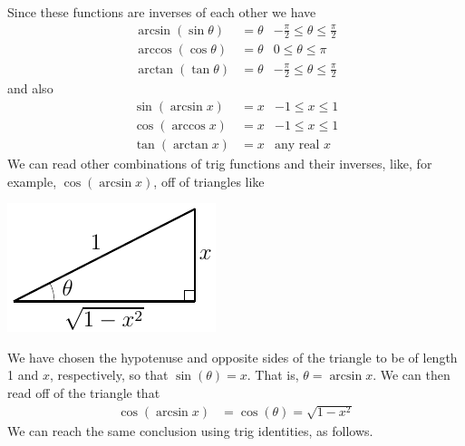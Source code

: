 Since these functions are inverses of each other we have
\begin{align*}
  \arcsin(\sin \theta) &= \theta & -\frac{\pi}{2} \leq \theta \leq \frac{\pi}{2} \\
  \arccos(\cos \theta) &= \theta & 0 \leq \theta \leq \pi \\
  \arctan(\tan \theta) &= \theta & -\frac{\pi}{2} \leq \theta \leq \frac{\pi}{2}
\end{align*}
and also
\begin{align*}
  \sin(\arcsin x) &= x & -1 \leq x \leq 1 \\
  \cos(\arccos x) &= x & -1 \leq x \leq 1 \\
  \tan(\arctan x) &= x & \text{any real $x$}
\end{align*}
We can read other combinations of trig functions and their inverses, like, for
example, $\cos(\arcsin x)$, off of triangles like
\begin{efig}
\begin{center}
\includegraphics{../differentiation/triangleAsin}
\end{center}
\end{efig}
We have chosen the hypotenuse and opposite sides of the triangle
to be of length 1 and $x$, respectively, so that
$\sin(\theta)=x$. That is, $\theta =  \arcsin x$. We can then
read off of the triangle that
\begin{align*}
  \cos(\arcsin x) &= \cos(\theta) = \sqrt{1-x^2}
\end{align*}
We can reach the same conclusion using trig identities, as
follows.
